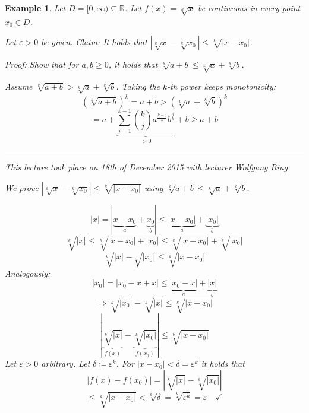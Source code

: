 \documentclass[a4paper,landscape,twocolumn]{article}
\newtheorem{ex}{Example}
\newcommand\abs[1]{\left|#1\right|}
\newcommand\meta[3]{\hrule{} This #1 took place on #2 with lecturer #3.\par}
\begin{document}
\begin{ex}
  Let $D = [0, \infty) \subseteq \mathbb R$.
  Let $f(x) = \sqrt[k]{x}$ be continuous in every point $x_0 \in D$.

  Let $\varepsilon > 0$ be given.
  Claim: It holds that $\abs{\sqrt[k]{x} - \sqrt[k]{x_0}} \leq \sqrt[k]{\abs{x - x_0}}$.

  Proof: Show that for $a,b \geq 0$, it holds that
  $\sqrt[k]{a + b} \leq \sqrt[k]{a} + \sqrt[k]{b}$.

  Assume $\sqrt[k]{a + b} > \sqrt[k]{a} + \sqrt[k]{b}$.
  Taking the $k$-th power keeps monotonicity:
  \[ (\sqrt[k]{a + b})^k = a + b > \left(\sqrt[k]{a} + \sqrt[k]{b}\right)^k \]
  \[ = a + \underbrace{\sum_{j=1}^{k-1} {k \choose j} a^{\frac{k-j}{k}} b^{\frac{j}{k}}}_{>0} + b \geq a + b \]

  \meta{lecture}{18th of December 2015}{Wolfgang Ring}

  We prove $\abs{\sqrt[k]{x} - \sqrt[k]{x_0}} \leq \sqrt[k]{\abs{x - x_0}}$
  using $\sqrt[k]{a + b} \leq \sqrt[k]{a} + \sqrt[k]{b}$.

  \[
    \abs{x}
    = \abs{\underbrace{x - x_0}_{a} + \underbrace{x_0}_{b}}
    \leq \underbrace{\abs{x - x_0}}_{a} + \underbrace{\abs{x_0}}_{b}
  \] \[
    \sqrt[k]{\abs{x}}
    \leq \sqrt[k]{\abs{x - x_0} + \abs{x_0}}
    \leq \sqrt[k]{\abs{x - x_0}} + \sqrt[k]{\abs{x_0}}
  \] \[
    \sqrt[k]{\abs x} - \sqrt{\abs{x_0}} \leq \sqrt[k]{\abs{x - x_0}}
  \]
  Analogously:
  \[ \abs{x_0} = \abs{x_0 - x + x} \leq \underbrace{\abs{x_0 - x}}_{a} + \underbrace{\abs{x}}_{b} \]
  \[ \Rightarrow \sqrt[k]{\abs{x_0}} - \sqrt[k]{\abs x} \leq \sqrt[k]{\abs{x - x_0}} \]
  \[ \abs{\underbrace{\sqrt[k]{\abs x}}_{f(x)} - \underbrace{\sqrt[k]{\abs{x_0}}}_{f(x_0)}} \leq \sqrt[k]{\abs{x - x_0}} \]
  Let $\varepsilon > 0$ arbitrary. Let $\delta \coloneqq \varepsilon^k$.
  For $\abs{x - x_0} < \delta = \varepsilon^k$ it holds that
  \[ \abs{f(x) - f(x_0)} = \abs{\sqrt[k]{\abs x} - \sqrt[k]{\abs{x_0}}} \]
  \[ \leq \sqrt[k]{\abs{x - x_0}} < \sqrt[k]{\delta} = \sqrt[k]{\varepsilon^k} = \varepsilon \quad\checkmark \]
\end{ex}
\end{document}
